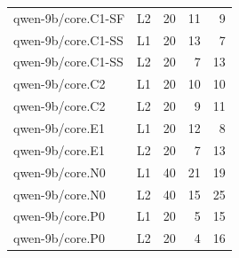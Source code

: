 \begin{longtable}{@{}llrrr@{}}
qwen-9b/\allowbreak core.\allowbreak C1-SF & L2 & 20 & 11 & 9\\
qwen-9b/\allowbreak core.\allowbreak C1-SS & L1 & 20 & 13 & 7\\
qwen-9b/\allowbreak core.\allowbreak C1-SS & L2 & 20 & 7 & 13\\
qwen-9b/\allowbreak core.\allowbreak C2 & L1 & 20 & 10 & 10\\
qwen-9b/\allowbreak core.\allowbreak C2 & L2 & 20 & 9 & 11\\
qwen-9b/\allowbreak core.\allowbreak E1 & L1 & 20 & 12 & 8\\
qwen-9b/\allowbreak core.\allowbreak E1 & L2 & 20 & 7 & 13\\
qwen-9b/\allowbreak core.\allowbreak N0 & L1 & 40 & 21 & 19\\
qwen-9b/\allowbreak core.\allowbreak N0 & L2 & 40 & 15 & 25\\
qwen-9b/\allowbreak core.\allowbreak P0 & L1 & 20 & 5 & 15\\
qwen-9b/\allowbreak core.\allowbreak P0 & L2 & 20 & 4 & 16\\

\end{longtable}

